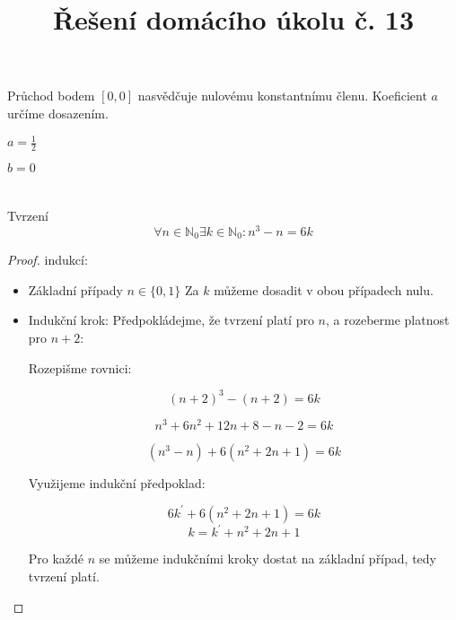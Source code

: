 \documentclass[10pt,a4paper]{article}
\title{Řešení domácího úkolu č. 13}
\date{}
\begin{document}
\maketitle

\section{}

Průchod bodem $[0,0]$ nasvědčuje nulovému konstantnímu členu.
Koeficient $a$ určíme dosazením.

$a = \frac12$

$b = 0$

\section{}

Tvrzení \[ \forall n \in \mathbb{N}_0 \exists k \in \mathbb{N}_0 :  n^3 - n = 6k \]

\begin{proof} indukcí:

\begin{itemize}
\item Základní případy $n \in \{0, 1\}$
Za $k$ můžeme dosadit v obou případech nulu.
\item Indukční krok: Předpokládejme, že tvrzení platí pro $n$, a rozeberme platnost pro $n+2$:

Rozepišme rovnici:


\[ (n+2)^3 - (n + 2) = 6k \]

\[ n^3 + 6n^2 + 12n + 8 - n - 2 = 6k \]

\[ (n^3 - n) + 6(n^2 + 2n + 1) = 6k \]

Využijeme indukční předpoklad:

\[ 6k^\prime + 6(n^2 + 2n + 1) = 6k \]
\[ k = k^\prime + n^2 + 2n + 1  \]

Pro každé $n$ se můžeme indukčními kroky dostat na základní případ, tedy tvrzení platí. 


\end{itemize}
\end{proof}
\end{document}

